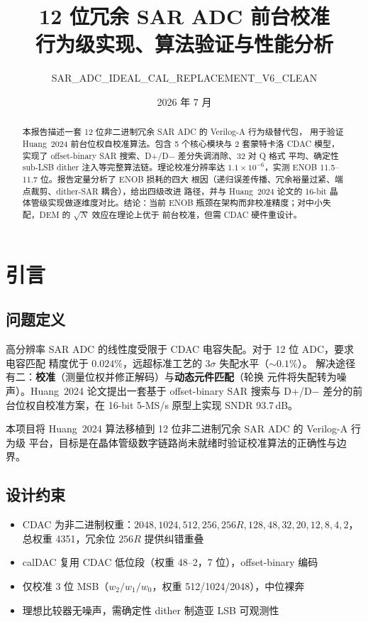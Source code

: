 \documentclass[UTF8,a4paper,11pt,twoside]{ctexrep}
\title{\bfseries 12 位冗余 SAR ADC 前台校准\\[2pt]
       \large 行为级实现、算法验证与性能分析}
\author{SAR\_ADC\_IDEAL\_CAL\_REPLACEMENT\_V6\_CLEAN}
\date{2026 年 7 月}
\begin{document}
\maketitle

\begin{abstract}
\noindent
本报告描述一套 12 位非二进制冗余 SAR ADC 的 Verilog-A 行为级替代包，
用于验证 Huang~2024 前台位权自校准算法。包含 5 个核心模块与 2 套蒙特卡洛
CDAC 模型，实现了 offset-binary SAR 搜索、D+/D$-$ 差分失调消除、32 对 Q 格式
平均、确定性 sub-LSB dither 注入等完整算法链。理论校准分辨率达
$1.1\times10^{-6}$，实测 ENOB 11.5--11.7 位。报告定量分析了 ENOB 损耗的四大
根因（递归误差传播、冗余裕量过紧、端点裁剪、dither-SAR 耦合），给出四级改进
路径，并与 Huang~2024 论文的 16-bit 晶体管级实现做逐维度对比。结论：当前
ENOB 瓶颈在架构而非校准精度；对中小失配，DEM 的 $\sqrt{N}$ 效应在理论上优于
前台校准，但需 CDAC 硬件重设计。
\end{abstract}

\tableofcontents

\chapter{引言}

\section{问题定义}

高分辨率 SAR ADC 的线性度受限于 CDAC 电容失配。对于 12 位 ADC，要求电容匹配
精度优于 $0.024\%$，远超标准工艺的 $3\sigma$ 失配水平（$\sim 0.1\%$）。
解决途径有二：\textbf{校准}（测量位权并修正解码）与\textbf{动态元件匹配}（轮换
元件将失配转为噪声）。Huang~2024 论文\cite{huang2024}提出一套基于 offset-binary
SAR 搜索与 D+/D$-$ 差分的前台位权自校准方案，在 16-bit 5-MS/s 原型上实现
SNDR 93.7\,dB。

本项目将 Huang~2024 算法移植到 12 位非二进制冗余 SAR ADC 的 Verilog-A 行为级
平台，目标是在晶体管级数字链路尚未就绪时验证校准算法的正确性与边界。

\section{设计约束}

\begin{itemize}
\item CDAC 为非二进制权重：$2048,1024,512,256,256R,128,48,32,20,12,8,4,2$，
      总权重 4351，冗余位 $256R$ 提供纠错重叠
\item calDAC 复用 CDAC 低位段（权重 48--2，7 位），offset-binary 编码
\item 仅校准 3 位 MSB（$w_2/w_1/w_0$，权重 512/1024/2048），中位裸奔
\item 理想比较器无噪声，需确定性 dither 制造亚 LSB 可观测性
\end{itemize}
\end{document}
